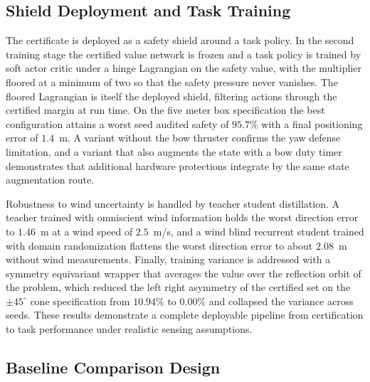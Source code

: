 \documentclass[journal]{IEEEtran}
\begin{document}
\subsection{Shield Deployment and Task Training}

The certificate is deployed as a safety shield around a task policy. In the second training stage the certified value network is frozen and a task policy is trained by soft actor critic \cite{haarnoja2018} under a hinge Lagrangian on the safety value, with the multiplier floored at a minimum of two so that the safety pressure never vanishes. The floored Lagrangian is itself the deployed shield, filtering actions through the certified margin at run time. On the five meter box specification the best configuration attains a worst seed audited safety of $95.7\%$ with a final positioning error of $1.4$~m. A variant without the bow thruster confirms the yaw defense limitation, and a variant that also augments the state with a bow duty timer demonstrates that additional hardware protections integrate by the same state augmentation route.

Robustness to wind uncertainty is handled by teacher student distillation. A teacher trained with omniscient wind information holds the worst direction error to $1.46$~m at a wind speed of $2.5$~m/s, and a wind blind recurrent student trained with domain randomization flattens the worst direction error to about $2.08$~m without wind measurements. Finally, training variance is addressed with a symmetry equivariant wrapper that averages the value over the reflection orbit of the problem, which reduced the left right asymmetry of the certified set on the $\pm45^\circ$ cone specification from $10.94\%$ to $0.00\%$ and collapsed the variance across seeds. These results demonstrate a complete deployable pipeline from certification to task performance under realistic sensing assumptions.

\subsection{Baseline Comparison Design}\label{subsec_baselines}

\end{document}
